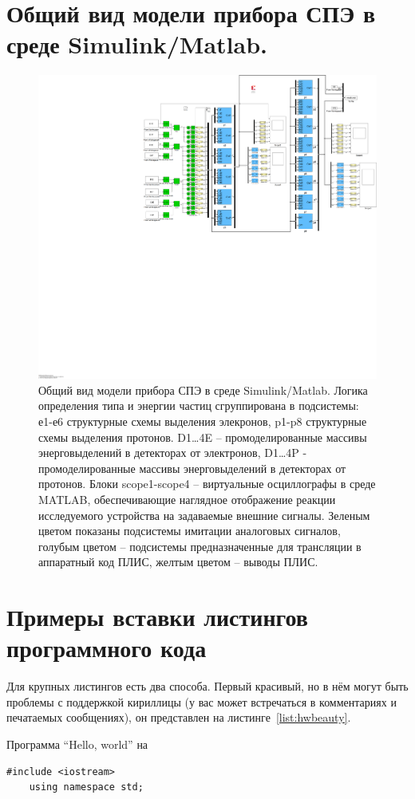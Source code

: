 {\chapter{Общий вид модели прибора СПЭ в среде Simulink/Matlab.} \label{AppendixB}
\begin{figure}
	\centering
	\includegraphics[width=0.7\linewidth]{images/simulink}
	\caption{Общий вид модели прибора СПЭ в среде Simulink/Matlab. Логика определения типа и энергии частиц сгруппирована в подсистемы: е1-е6 структурные схемы выделения элекронов,  p1-p8 структурные схемы выделения протонов. D1…4E – промоделированные массивы энерговыделений в детекторах от электронов, D1…4P -  промоделированные массивы энерговыделений в детекторах от протонов. Блоки scope1-scope4 – виртуальные осциллографы в среде MATLAB, обеспечивающие наглядное отображение реакции исследуемого устройства на задаваемые внешние сигналы. Зеленым цветом показаны подсистемы имитации аналоговых сигналов, голубым цветом – подсистемы предназначенные для трансляции в аппаратный код ПЛИС, желтым цветом – выводы ПЛИС.}
	\label{fig:simulink}
\end{figure}

\chapter{Примеры вставки листингов программного кода} \label{AppendixC}

Для крупных листингов есть два способа. Первый красивый, но в нём могут быть проблемы с поддержкой кириллицы (у вас может встречаться в комментариях и
печатаемых сообщениях), он представлен на листинге~\ref{list:hwbeauty}.
\begin{ListingEnv}[H]%
    \caption{Программа “Hello, world” на \protect\cpp}
    \label{list:hwbeauty}
    \begin{lstlisting}[language={[ISO]C++}]
	#include <iostream>
	using namespace std;


\end{lstlisting}
\end{ListingEnv}}
